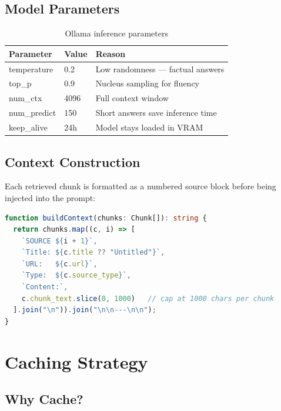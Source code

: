 \documentclass[12pt,a4paper]{report}
\begin{document}
\section{Model Parameters}

\begin{table}[H]
\centering
\caption{Ollama inference parameters}
\begin{tabular}{lll}
\toprule
\textbf{Parameter} & \textbf{Value} & \textbf{Reason} \\
\midrule
temperature  & 0.2  & Low randomness --- factual answers \\
top\_p       & 0.9  & Nucleus sampling for fluency \\
num\_ctx     & 4096 & Full context window \\
num\_predict & 150  & Short answers save inference time \\
keep\_alive  & 24h  & Model stays loaded in VRAM \\
\bottomrule
\end{tabular}
\end{table}

\section{Context Construction}

Each retrieved chunk is formatted as a numbered source block before being injected into the prompt:

\begin{lstlisting}[language=TypeScript, caption=Building the LLM context string]
function buildContext(chunks: Chunk[]): string {
  return chunks.map((c, i) => [
    `SOURCE ${i + 1}`,
    `Title: ${c.title ?? "Untitled"}`,
    `URL:   ${c.url}`,
    `Type:  ${c.source_type}`,
    `Content:`,
    c.chunk_text.slice(0, 1000)   // cap at 1000 chars per chunk
  ].join("\n")).join("\n\n---\n\n");
}
\end{lstlisting}

\chapter{Caching Strategy}

\section{Why Cache?}
\end{document}
